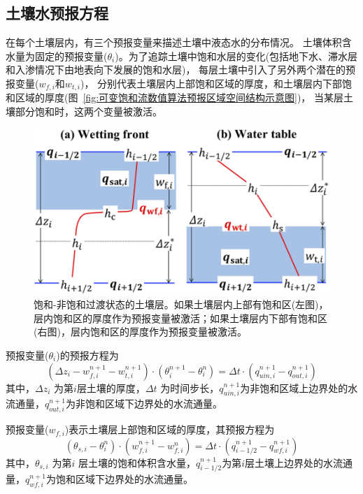 \subsection{土壤水预报方程}
在每个土壤层内，有三个预报变量来描述土壤中液态水的分布情况。
土壤体积含水量为固定的预报变量($\theta_i$)。为了追踪土壤中饱和水层的变化(包括地下水、滞水层和入渗情况下由地表向下发展的饱和水层)，
每层土壤中引入了另外两个潜在的预报变量($w_{f,i}$和$w_{t,i}$)，
分别代表土壤层内上部饱和区域的厚度，和土壤层内下部饱和区域的厚度(图~\ref{fig:可变饱和流数值算法预报区域空间结构示意图})，
当某层土壤部分饱和时，这两个变量被激活。
{
\begin{figure}[]
\centering
\includegraphics{Figures/陆地表面的水分循环/饱和-非饱和过渡状态的土壤层.png}
\caption{饱和-非饱和过渡状态的土壤层。如果土壤层内上部有饱和区(左图)，
层内饱和区的厚度作为预报变量被激活；如果土壤层内下部有饱和区(右图)，层内饱和区的厚度作为预报变量被激活。}
\label{fig:饱和-非饱和过渡状态的土壤层}
\end{figure}
}


预报变量($\theta_i$)的预报方程为
\begin{equation}\label{si_in1}
\left(\Delta z_{i}-w_{f, i}^{n+1}-w_{t, i}^{n+1}\right) \cdot\left(\theta_{i}^{n+1}-\theta_{i}^{n}\right)=\Delta t \cdot\left(q_{ {uin,i }}^{n+1}-q_{ {out }, i}^{n+1}\right)
\end{equation}
其中，$\Delta z_i$ 为第$ i $层土壤的厚度，$\Delta t$ 为时间步长，$q_{uin,i}^{n+1}$为非饱和区域上边界处的水流通量，$q_{out,i}^{n+1}$为非饱和区域下边界处的水流通量。


预报变量($w_{f,i}$)表示土壤层上部饱和区域的厚度，其预报方程为
\begin{equation}\label{si_in2}
\left(\theta_{s, i}-\theta_{i}^{n}\right) \cdot\left(w_{f, i}^{n+1}-w_{f, i}^{n}\right)=\Delta t \cdot\left(q_{i-1/2}^{n+1}-q_{w f, i}^{n+1}\right)
\end{equation}
其中，$\theta_{s,i}$ 为第$ i$ 层土壤的饱和体积含水量，$ q_{{i-1/2}}^{n+1}$为第$i$层土壤上边界处的水流通量，$q_{wf,i}^{n+1}$为饱和区域下边界处的水流通量。


